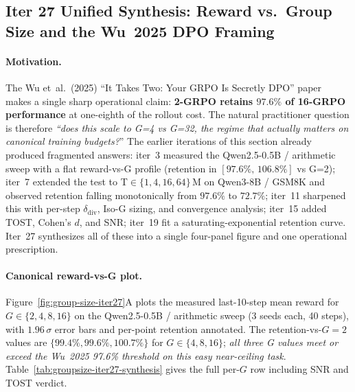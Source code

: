 \subsection{Iter 27 Unified Synthesis: Reward vs.\ Group Size and the Wu~2025 DPO Framing}
\label{sec:group-size-iter27}

\paragraph{Motivation.}
The Wu et~al.\ (2025) ``It Takes Two: Your GRPO Is Secretly DPO''
paper~\cite{wu2025grpo_dpo} makes a single sharp operational claim:
\textbf{2-GRPO retains $97.6\%$ of 16-GRPO performance} at one-eighth
of the rollout cost. The natural practitioner question is therefore
\emph{``does this scale to G=4 vs G=32, the regime that actually
matters on canonical training budgets?}''  The earlier iterations of
this section already produced fragmented answers: iter~3 measured the
Qwen2.5-0.5B / arithmetic sweep with a flat reward-vs-G profile
(retention in $[97.6\%,\,106.8\%]$ vs G=2); iter~7 extended the test
to T$\in\{1,4,16,64\}$\,M on Qwen3-8B / GSM8K and observed retention
falling monotonically from $97.6\%$ to $72.7\%$; iter~11 sharpened
this with per-step $\delta_\text{div}$, Iso-G sizing, and convergence
analysis; iter~15 added TOST, Cohen's $d$, and SNR; iter~19 fit a
saturating-exponential retention curve. Iter~27 synthesizes all of
these into a single four-panel figure and one operational prescription.

\paragraph{Canonical reward-vs-G plot.}
Figure~\ref{fig:group-size-iter27}A plots the measured last-10-step
mean reward for $G\in\{2,4,8,16\}$ on the Qwen2.5-0.5B /
arithmetic sweep (3 seeds each, 40 steps), with $1.96\,\sigma$ error
bars and per-point retention annotated. The retention-vs-$G{=}2$ values
are $\{99.4\%, 99.6\%, 100.7\%\}$ for $G\in\{4,8,16\}$; \emph{all three
G values meet or exceed the Wu~2025 97.6\% threshold on this easy
near-ceiling task}. Table~\ref{tab:groupsize-iter27-synthesis}
gives the full per-$G$ row including SNR and TOST verdict.

